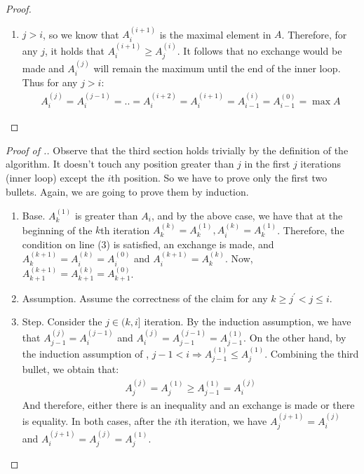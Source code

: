 \begin{proof}
\begin{enumerate}
\begin{enumerate}
        \item $j > i$, so we know that $A^{(i+1)}_{i}$ is the maximal element in $A$. Therefore, for any $j$, it holds that $A^{(i+1)}_{i}\ge A^{(i)}_{j}$. It follows that no exchange would be made and $A^{(j)}_{i}$ will remain the maximum until the end of the inner loop. Thus for any $j >i$:   
          \begin{equation*}
            \begin{split}
              A^{(j)}_{i}=A^{(j-1)}_{i}=.. =A^{(i+2)}_{i}=A^{(i+1)}_{i}=A^{(i)}_{i-1}=A^{(0)}_{i-1}=\max A
            \end{split}
          \end{equation*}
\end{enumerate}
\end{enumerate}
  \end{proof}
  \begin{proof}[Proof of .]
  Observe that the third section holds trivially by the definition of the algorithm. It doesn't touch any position greater than $j$ in the first $j$ iterations (inner loop) except the $i$th position. So we have to prove only the first two bullets. Again, we are going to prove them by induction.  
  \begin{enumerate}
    \item Base. $A^{(1)}_{k}$ is greater than $A_{i}$, and by the above case, we have that at the beginning of the $k$th iteration $A^{(k)}_{k}=A^{(1)}_{k}, A^{(k)}_{i}=A^{(1)}_{k}$. Therefore, the condition on line (3) is satisfied, an exchange is made, and $A^{(k+1)}_{k} =A^{(k)}_{i} = A^{(0)}_{i}$ and $A^{(k+1)}_{i} = A^{(k)}_{k}$. Now, $A^{(k+1)}_{k+1} = A^{(k)}_{k+1} = A^{(0)}_{k+1}$.
    \item Assumption. Assume the correctness of the claim for any $k\ge j^{\prime} < j \le i$. 
    \item Step. Consider the $j \in (k,i]$ iteration. By the induction assumption, we have that $A^{(j)}_{j-1} = A^{(j-1)}_{i}$ and $A^{(j)}_{i} = A^{(j-1)}_{j-1} = A^{(1)}_{j-1}$. On the other hand, by the induction assumption of , $j-1 < i \Rightarrow A^{(1)}_{j-1} \le A^{(1)}_{j}$. Combining the third bullet, we obtain that:                
      \begin{equation*}
        \begin{split}
          A^{(j)}_{j} = A^{(1)}_{j} \ge A^{(1)}_{j-1} = A^{(j)}_{i}
        \end{split}
      \end{equation*}
      And therefore, either there is an inequality and an exchange is made or there is equality. In both cases, after the $i$th iteration, we have $A^{(j+1)}_{j} = A^{(j)}_{i}$ and $A^{(j+1)}_{i} = A^{(j)}_{j} = A^{(1)}_{j}$.
  \end{enumerate}
\end{proof}
